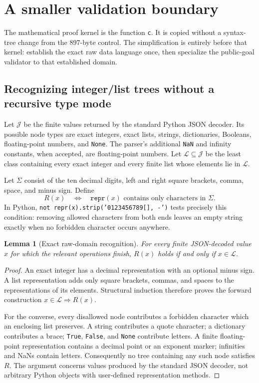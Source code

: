 \documentclass[11pt,letterpaper]{article}
\newtheorem{lemma}[theorem]{Lemma}
\theoremstyle{definition}
\theoremstyle{remark}
\begin{document}
\section{A smaller validation boundary}
\label{sec:validation-proof}
The mathematical proof kernel is the function \texttt{c}. It is copied
without a syntax-tree change from the 897-byte control. The simplification
is entirely before that kernel: establish the exact raw data language once,
then specialize the public-goal validator to that established domain.

\subsection{Recognizing integer/list trees without a recursive type mode}
Let $\mathcal J$ be the finite values returned by the standard Python JSON
decoder. Its possible node types are exact integers, exact lists, strings,
dictionaries, Booleans, floating-point numbers, and \texttt{None}.
The parser's additional \texttt{NaN} and infinity constants, when accepted,
are floating-point numbers. Let $\mathcal L\subseteq\mathcal J$ be the
least class containing every exact integer and every finite list whose
elements lie in $\mathcal L$.

Let $\Sigma$ consist of the ten decimal digits, left and right square
brackets, comma, space, and minus sign. Define
\[
 R(x)\quad\Longleftrightarrow\quad
 \texttt{repr}(x)\text{ contains only characters in }\Sigma.
\]
In Python, \texttt{not repr(x).strip('0123456789[], -')} tests precisely
this condition: removing allowed characters from both ends leaves an
empty string exactly when no forbidden character occurs anywhere.

\begin{lemma}[Exact raw-domain recognition]
\label{lem:repr}
For every finite JSON-decoded value $x$ for which the relevant operations
finish, $R(x)$ holds if and only if $x\in\mathcal L$.
\end{lemma}
\begin{proof}
An exact integer has a decimal representation with an optional minus sign.
A list representation adds only square brackets, commas, and spaces to
the representations of its elements. Structural induction therefore proves
the forward construction $x\in\mathcal L\Rightarrow R(x)$.

For the converse, every disallowed node contributes a forbidden character
which an enclosing list preserves. A string contributes a quote character;
a dictionary contributes a brace; \texttt{True}, \texttt{False}, and
\texttt{None} contribute letters. A finite floating-point representation
contains a decimal point or an exponent marker; infinities and NaNs contain
letters. Consequently no tree containing any such node satisfies $R$.
The argument concerns values produced by the standard JSON decoder, not
arbitrary Python objects with user-defined representation methods.
\end{proof}
\end{document}
